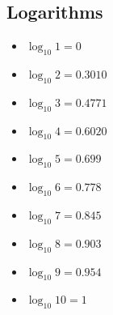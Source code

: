 \begin{multicols}{2}
\section{Logarithms}
\begin{itemize}
    \item \(\log_{10}{1} = 0\)
    \item \(\log_{10}{2} = 0.3010\)
    \item \(\log_{10}{3} = 0.4771\)
    \item \(\log_{10}{4} = 0.6020\)
    \item \(\log_{10}{5} = 0.699\)
    \item \(\log_{10}{6} = 0.778\)
    \item \(\log_{10}{7} = 0.845\)
    \item \(\log_{10}{8} = 0.903\)
    \item \(\log_{10}{9} = 0.954\)
    \item \(\log_{10}{10} = 1\)
\end{itemize}
\end{multicols}